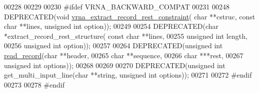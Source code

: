\begin{DoxyCode}
00228 
00229 
00230 \textcolor{preprocessor}{#ifdef  VRNA\_BACKWARD\_COMPAT}
00231 
00248 DEPRECATED(\textcolor{keywordtype}{void} \hyperlink{group__file__utils_ga55a9ae6dfeecc1b3f0c2acf6fa796c15}{vrna\_extract\_record\_rest\_constraint}( \textcolor{keywordtype}{char} **cstruc, \textcolor{keyword}{
      const} \textcolor{keywordtype}{char} **lines, \textcolor{keywordtype}{unsigned} \textcolor{keywordtype}{int} option));
00249 
00254 DEPRECATED(\textcolor{keywordtype}{char} *extract\_record\_rest\_structure( \textcolor{keyword}{const} \textcolor{keywordtype}{char} **lines,
00255                                                 \textcolor{keywordtype}{unsigned} \textcolor{keywordtype}{int} length,
00256                                                 \textcolor{keywordtype}{unsigned} \textcolor{keywordtype}{int} option));
00257 
00264 DEPRECATED(\textcolor{keywordtype}{unsigned} \textcolor{keywordtype}{int} \hyperlink{group__file__utils_gafd194a69af9d92b5b0412a7627ac1595}{read\_record}(\textcolor{keywordtype}{char} **header,
00265                                     \textcolor{keywordtype}{char} **sequence,
00266                                     \textcolor{keywordtype}{char}  ***rest,
00267                                     \textcolor{keywordtype}{unsigned} \textcolor{keywordtype}{int} options));
00268 
00269 
00270 DEPRECATED(\textcolor{keywordtype}{unsigned} \textcolor{keywordtype}{int} get\_multi\_input\_line(\textcolor{keywordtype}{char} **\textcolor{keywordtype}{string}, \textcolor{keywordtype}{unsigned} \textcolor{keywordtype}{int} options));
00271 
00272 \textcolor{preprocessor}{#endif}
00273 
00278 \textcolor{preprocessor}{#endif}
\end{DoxyCode}
